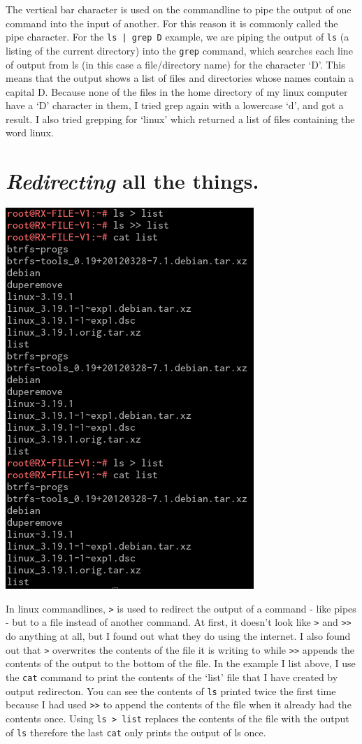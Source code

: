 \documentclass[11pt,twoside,a4paper]{article}
\begin{document}
		The vertical bar character is used on the commandline to pipe the output of one command into the input of another. For this reason it is commonly called the pipe character. For the \verb!ls | grep D! example, we are piping the output of \verb|ls| (a listing of the current directory) into the \verb|grep| command, which searches each line of output from ls (in this case a file/directory name) for the character `D'. This means that the output shows a list of files and directories whose names contain a capital D. Because none of the files in the home directory of my linux computer have a `D' character in them, I tried grep again with a lowercase `d', and got a result. I also tried grepping for `linux' which returned a list of files containing the word linux.

	\section{\emph{Redirecting} all the things.}

		\includegraphics{redirection}

		In linux commandlines, \verb|>| is used to redirect the output of a command - like pipes - but to a file instead of another command.\cite{redirection} At first, it doesn't look like \verb|>| and \verb|>>| do anything at all, but I found out what they do using the internet. I also found out that \verb|>| overwrites the contents of the file it is writing to while \verb|>>| appends the contents of the output to the bottom of the file. In the example I list above, I use the \verb|cat| command to print the contents of the `list' file that I have created by output redirecton. You can see the contents of \verb|ls| printed twice the first time because I had used \verb|>>| to append the contents of the file when it already had the contents once. Using \verb|ls > list| replaces the contents of the file with the output of \verb|ls| therefore the last \verb|cat| only prints the output of ls once.
\end{document}
